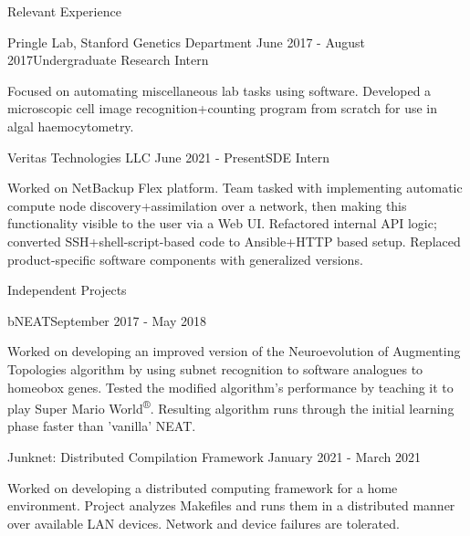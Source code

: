 \documentclass{resume} %
\begin{document}
\begin{resumeSection}{Relevant Experience}

\begin{resumeSubsection}{Pringle Lab, Stanford Genetics Department}
	{June 2017 - August 2017}{Undergraduate Research Intern}{}
\item Focused on automating miscellaneous lab tasks using software. Developed a
	microscopic cell image recognition+counting program from scratch for
	use in algal haemocytometry.
\end{resumeSubsection}
\begin{resumeSubsection}{Veritas Technologies LLC}
	{June 2021 - Present}{SDE Intern}{}
\item Worked on NetBackup Flex platform. Team tasked with implementing
	automatic compute node discovery+assimilation over a network, then
	making this functionality visible to the user via a Web UI. Refactored
	internal API logic; converted SSH+shell-script-based code to
	Ansible+HTTP based setup. Replaced product-specific software components
	with generalized versions. 
	
\end{resumeSubsection}

\end{resumeSection}


\begin{resumeSection}{Independent Projects} \itemsep -2pt

\begin{resumeSubsection}{bNEAT}{September 2017 - May 2018}{}{}
\item Worked on developing an improved version of the Neuroevolution of
	Augmenting Topologies algorithm by using subnet recognition to
	software analogues to homeobox genes. Tested the modified
	algorithm's performance by teaching it to play Super Mario
	World\textsuperscript{®}. Resulting algorithm runs through the initial
	learning phase faster than 'vanilla' NEAT.
\end{resumeSubsection}
\begin{resumeSubsection}{Junknet: Distributed Compilation Framework}
	{January 2021 - March 2021}{}{}
\item Worked on developing a distributed computing framework for a home
	environment. Project analyzes Makefiles and runs them in a distributed
	manner over available LAN devices. Network and device failures are
	tolerated.
\end{resumeSubsection}

\end{resumeSection}
\end{document}
